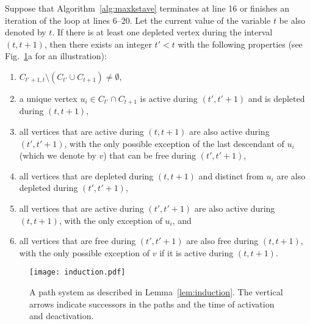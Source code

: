 \documentclass{llncs}
\begin{document}
\begin{lemma}\label{lem:induction}
Suppose that Algorithm~\ref{alg:maxkstave} terminates at line 
16 or finishes an iteration of the loop at lines 6--20. Let the current value of the variable $t$ be also denoted by $t$. If there is at least one depleted vertex during the interval $(t,t+1)$, then there exists an integer $t'<t$ with the following properties (see Fig.~\ref{fig:induction}a for an illustration):
\begin{enumerate}[\quad(i)]
\item $C_{t'+1,t}\setminus (C_{t'} \cup C_{t+1})\neq\emptyset$,
\item a unique vertex $u_i\in C_{t'}\cap C_{t+1}$ is active during $(t',t'+1)$ and is depleted during $(t,t+1)$, 
\item all vertices that are active during $(t,t+1)$ are also active during $(t',t'+1)$, with the only possible exception of 
the last descendant of $u_i$ (which we denote by $v$) 
that can be free during $(t',t'+1)$, 
\item all vertices that are depleted during $(t,t+1)$ and distinct from $u_i$ are also depleted during $(t',t'+1)$,
\item all vertices that are active during $(t',t'+1)$ are also active during $(t,t+1)$, with the only exception of $u_i$, and 
\item all vertices that are free during $(t',t'+1)$ are also free during $(t,t+1)$, with the only possible exception of $v$ if it is active during $(t,t+1)$.
\end{enumerate}
\end{lemma}

\begin{figure}[h]
\begin{center}
\texttt{[image: induction.pdf]}
\end{center}
\caption{A path system as described in Lemma~\ref{lem:induction}. The vertical arrows indicate successors in the paths and the time of activation and deactivation.}\label{fig:induction}
\end{figure}
\end{document}

